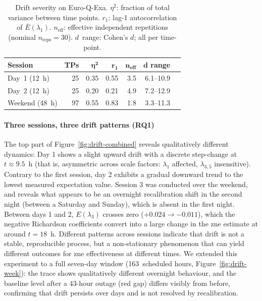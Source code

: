 \documentclass[10pt,conference]{IEEEtran}
\begin{document}
\begin{table}[htbp]
  \caption{Drift severity on Euro-Q-Exa.
  $\eta^2$: fraction of total variance between time points.
  $r_1$: lag-1 autocorrelation of  $\bar{E}(\lambda_1)$.
  $n_\text{eff}$: effective independent repetitions (nominal $n_{\text{reps}} = 30$).
  $d$~range: Cohen's $d$; all per time-point.}
  \label{tab:drift-summary}
  \centering
  \begin{tabular}{@{}lrrrrrl@{}}
    \toprule
    \textbf{Session} & \textbf{TPs} & $\boldsymbol{\eta^2}$ & $\boldsymbol{r_1}$ & $\boldsymbol{n_\text{eff}}$ & $\boldsymbol{d}$ \textbf{range} \\
    \midrule
    Day~1 (12~h)    & 25 & 0.35 & 0.55 & 3.5 & 6.1--10.9 \\
    Day~2 (12~h)    & 25 & 0.20 & 0.21 & 4.9 & 7.2--12.9 \\
    Weekend (48~h)  & 97 & 0.55 & 0.83 & 1.8 & 3.3--11.3 \\ 
    \bottomrule
  \end{tabular}
\end{table}

\paragraph{Three sessions, three drift patterns (RQ1)}
The top part of Figure~\ref{fig:drift-combined} reveals qualitatively different dynamics: Day 1 shows a slight upward drift with a discrete step-change at $t \approx 9.5$~h (that is, asymmetric across scale factors: $\lambda_1$ affected, $\lambda_{3,5}$ insensitive). Contrary to the first session, day 2 exhibits a gradual downward trend to the lowest measured expectation value. Session 3 was conducted over the weekend, and reveals what appears to be an overnight recalibration shift in the second night (between a Saturday and Sunday), which is absent in the first night. Between days 1 and 2, $E(\lambda_3)$ crosses zero ($+0.024 \to -0.011$), which the negative Richardson coefficients convert into a large change in the \gls{zne} estimate at around $t = 18$~h. Different patterns across sessions indicate that drift is not a stable, reproducible process, but a non-stationary phenomenon that can yield different outcomes for \gls{zne} effectiveness at different times. We extended this experiment to a full seven-day window (163~scheduled hours, Figure~\ref{fig:drift-week}): the trace shows qualitatively different overnight behaviour, and the baseline level after a 43-hour outage (red gap) differs visibly from before, confirming that drift persists over days and is not resolved by recalibration.
\end{document}
